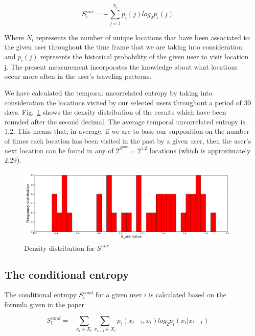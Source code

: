\begin{equation}
S_{i}^{unc} = -\sum\limits_{j=1}^{N_{i}}p_{i}(j)log_{2}p_{i}(j)
\end{equation}

Where $N_{i}$ represents the number of unique locations that have been
associated to the given user throughout the time frame that we are taking into
consideration and $p_{i}(j)$ represents the historical probability of the given
user to visit location j. The present measurement incorporates the knowledge
about what locations occur more often in the user's traveling patterns.

We have calculated the temporal uncorrelated entropy by taking into
consideration the locations visited by our selected users throughout a period of
$30$ days. Fig.~\ref{dis_tu_e} shows the density distribution of the results
which have been rounded after the second decimal. The average temporal
uncorrelated entropy is $1.2$. This means that, in average, if we are to base
our supposition on the number of times each location has been visited in the
past by a given user, then the user's next location can be found in any of
$2^{S^{unc}} = 2^{1.2}$ locations (which is approximately $2.29$).

\begin{figure}[!h]
\centering
\includegraphics[width=\textwidth]{figures/entro_pred/tu_entro_distrib.png}
\caption{Density distribution for $S^{unc}$}
\label{dis_tu_e}
\end{figure}

\subsection{The conditional entropy}
\label{con_e}
The conditional entropy $S_{i}^{cond}$ for a given user $i$ is calculated based
on the formula given in the paper \cite{Sinatra14}

\begin{equation}
S_{i}^{cond} = - \sum\limits_{x_{t}\in X_{i}} \sum\limits_{x_{t-1}\in X_{i}}
p_{i}(x_{t-1},x_{t})log_{2}p_{i}(x_{t}|x_{t-1})
\end{equation}

